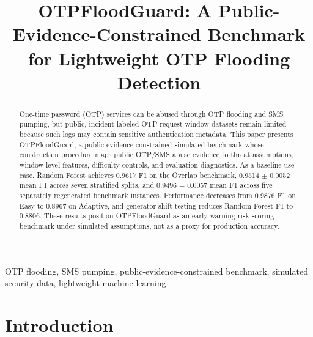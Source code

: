 \documentclass[conference]{IEEEtran}
\begin{document}
\title{OTPFloodGuard: A Public-Evidence-Constrained Benchmark for Lightweight OTP Flooding Detection}

\author{
}

\maketitle

\begin{abstract}
One-time password (OTP) services can be abused through OTP flooding and SMS pumping, but public, incident-labeled OTP request-window datasets remain limited because such logs may contain sensitive authentication metadata. This paper presents OTPFloodGuard, a public-evidence-constrained simulated benchmark whose construction procedure maps public OTP/SMS abuse evidence to threat assumptions, window-level features, difficulty controls, and evaluation diagnostics. As a baseline use case, Random Forest achieves 0.9617 F1 on the Overlap benchmark, 0.9514 $\pm$ 0.0052 mean F1 across seven stratified splits, and 0.9496 $\pm$ 0.0057 mean F1 across five separately regenerated benchmark instances. Performance decreases from 0.9876 F1 on Easy to 0.8967 on Adaptive, and generator-shift testing reduces Random Forest F1 to 0.8806. These results position OTPFloodGuard as an early-warning risk-scoring benchmark under simulated assumptions, not as a proxy for production accuracy.
\end{abstract}

\begin{IEEEkeywords}
OTP flooding, SMS pumping, public-evidence-constrained benchmark, simulated security data, lightweight machine learning
\end{IEEEkeywords}

\section{Introduction}
\end{document}
